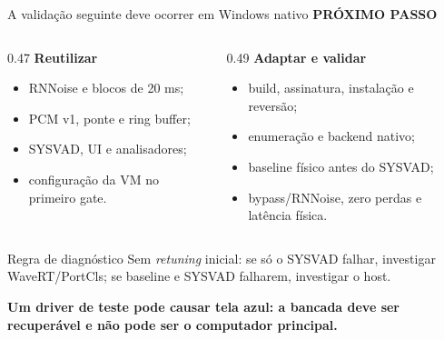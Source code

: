\documentclass[aspectratio=169,10pt]{beamer}
\newcommand{\kicker}[1]{%
    {\color{signalorange}\scriptsize\bfseries\MakeUppercase{#1}}\par\vspace{0.08cm}
}
\begin{document}
\begin{frame}{A validação seguinte deve ocorrer em Windows nativo}
    \kicker{Próximo passo}
    \begin{columns}[T,onlytextwidth]
        \begin{column}{0.47\textwidth}
            \textbf{Reutilizar}
            \begin{itemize}
                \item RNNoise e blocos de 20 ms;
                \item PCM v1, ponte e ring buffer;
                \item SYSVAD, UI e analisadores;
                \item configuração da VM no primeiro gate.
            \end{itemize}
        \end{column}
        \begin{column}{0.49\textwidth}
            \textbf{Adaptar e validar}
            \begin{itemize}
                \item build, assinatura, instalação e reversão;
                \item enumeração e backend nativo;
                \item baseline físico antes do SYSVAD;
                \item bypass/RNNoise, zero perdas e latência física.
            \end{itemize}
        \end{column}
    \end{columns}

    \vspace{0.2cm}
    \begin{block}{Regra de diagnóstico}
        Sem \textit{retuning} inicial: se só o SYSVAD falhar, investigar
        WaveRT/PortCls; se baseline e SYSVAD falharem, investigar o host.
    \end{block}

    \vspace{0.15cm}
    \centering
    {\color{alertred}\bfseries Um driver de teste pode causar tela azul: a
    bancada deve ser recuperável e não pode ser o computador principal.}
\end{frame}
\end{document}
